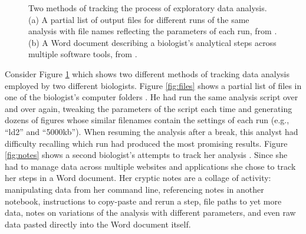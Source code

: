 \begin{figure}[t!]%
\centering
{}
\quad
{}
\caption[Two methods of tracking the process of exploratory data analysis]{Two methods of tracking the process of exploratory data analysis. (a) A partial list of output files for different runs of the same analysis with file names reflecting the parameters of each run, from \cite{guo_software_2012}. (b) A Word document describing a biologist's analytical steps across multiple software tools, from \cite{tabard2008individual}.}
\label{fig:trackmethods}
\end{figure}

Consider Figure \ref{fig:trackmethods} which shows two different methods of tracking data analysis employed by two different biologists. Figure \ref{fig:files} shows a partial list of files in one of the biologist's computer folders \cite{guo_software_2012}. He had run the same analysis script over and over again, tweaking the parameters of the script each time and generating dozens of figures whose similar filenames contain the settings of each run (e.g., ``ld2'' and ``5000kb''). When resuming the analysis after a break, this analyst had difficulty recalling which run had produced the most promising results. Figure \ref{fig:notes} shows a second biologist's attempts to track her analysis \cite{tabard2008individual}. Since she had to manage data across multiple websites and applications she chose to track her steps in a  Word document. Her cryptic notes are a collage of activity: manipulating data from her command line, referencing notes in another notebook, instructions to copy-paste and rerun a step, file paths to yet more data, notes on variations of the analysis with different parameters, and even raw data pasted directly into the Word document itself.

